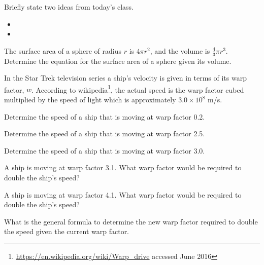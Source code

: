 \postClass

\begin{problem}
\item Briefly state two ideas from today's class.
  \begin{itemize}
  \item
  \item
  \end{itemize}
\item The surface area of a sphere of radius $r$ is $4\pi r^2$, and
  the volume is $\frac{4}{3}\pi r^3$. Determine the equation for the
  surface area of a sphere given its volume.
\item In the Star Trek television series a ship's velocity is given in
  terms of its warp factor, $w$. According to
  wikipedia\footnote{\href{https://en.wikipedia.org/wiki/Warp_drive}{https://en.wikipedia.org/wiki/Warp\_drive} accessed June 2016},
  the actual speed is the warp factor cubed multiplied by the speed of
  light which is approximately $3.0\times 10^8$ m/s.
  \begin{subproblem}
  \item Determine the speed of a ship that is moving at warp factor 0.2.
  \item Determine the speed of a ship that is moving at warp factor
    2.5.
  \item Determine the speed of a ship that is moving at warp factor
    3.0.
  \item A ship is moving at warp factor 3.1. What warp factor would be
    required to double the ship's speed?
  \item A ship is moving at warp factor 4.1. What warp factor would be
    required to double the ship's speed?
  \item What is the general formula to determine the new warp factor
    required to double the speed given the current warp factor.
  \end{subproblem}
\end{problem}


